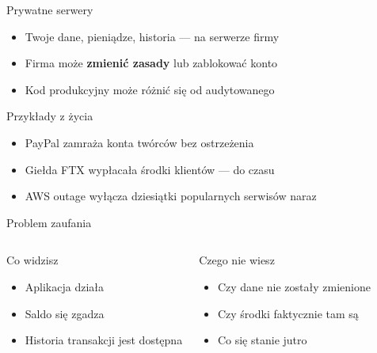 \begin{frame}{Prywatne serwery}
  \begin{itemize}
    \item Twoje dane, pieniądze, historia --- na serwerze firmy
    \item Firma może \textbf{zmienić zasady} lub zablokować konto
    \item Kod produkcyjny może różnić się od audytowanego
  \end{itemize}
  \vspace{0.4cm}
  \begin{exampleblock}{Przykłady z życia}
    \begin{itemize}
      \item PayPal zamraża konta twórców bez ostrzeżenia\\
      \item Giełda FTX wypłacała środki klientów --- do czasu\\
      \item AWS outage wyłącza dziesiątki popularnych serwisów naraz
    \end{itemize}
  \end{exampleblock}
\end{frame}

\begin{frame}{Problem zaufania}
  \begin{columns}
      \begin{block}{Co widzisz}
        \begin{itemize}
          \item Aplikacja działa
          \item Saldo się zgadza
          \item Historia transakcji jest dostępna
        \end{itemize}
      \end{block}

      \begin{alertblock}{Czego nie wiesz}
        \begin{itemize}
          \item Czy dane nie zostały zmienione
          \item Czy środki faktycznie tam są
          \item Co się stanie jutro
        \end{itemize}
      \end{alertblock}
  \end{columns}
\end{frame}

